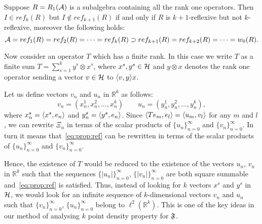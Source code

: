 \documentclass[12pt]{amsart}
\theoremstyle{case}
\begin{document}
  \begin{prop}
    Suppose $R = R_1(\cal{A})$ is a subalgebra containing all the rank one operators.
    Then $I \in ref_k(R)$ but $I \not\in ref_{k+1}(R)$ if and only if $R$ is $k + 1$-reflexive but not $k$-reflexive, moreover the
      following holds:
    \[
      \cal{A} = ref_1(R) = ref_2(R) = \dots = ref_k(R) \supset ref_{k + 1}(R) = ref_{k + 2}(R) = \dots = w_0(R).
    \]
  \end{prop}
  Now consider an operator $T$ which has a finite rank.
  In this case we write $T$ as a finite sum $T = \sum_{s=1}^k y^s \otimes x^s$,
    where $x^s, y^s \in \cal{H}$ and $y \otimes x$ denotes the rank one operator sending a vector $v \in \cal{H}$
    to $\inner{v}{y}x$.

  Let us define vectors $v_n$ and $u_n$ in $\mathbb{R}^k$ as follows:
  \begin{equation*}
    v_n = (x^1_n, x^2_n, \dots, x^k_n)\qquad
    u_n = (y^1_n, y^2_n, \dots, y^k_n),
  \end{equation*}
  where $x^s_n = \inner{x^s}{e_n}$ and $y^s_n = \inner{y^s}{e_n}$.
  Since $\inner{Te_m}{e_l} = \inner{u_m}{v_l}$ for any $m$ and $l$, we can rewrite $\Xi_n$ in terms of
    the scalar products of $\{u_n\}_{n=0}^\infty$ and $\{v_n\}_{n=0}^\infty$.
  In turn it means that~\eqref{eq:prop:ref} can be rewritten in terms of the scalar products
    of $\{u_n\}_{n=0}^\infty$ and $\{v_n\}_{n=0}^\infty$.

  Hence, the existence of $T$ would be reduced to the existence of
    the vectors $u_n$, $v_n$ in $\mathbb{R}^k$ such that the sequences $\{\lvert u_n\rvert\}_{n=0}^\infty$,
    $\{\lvert v_n\rvert\}_{n=0}^\infty$ are both square summable and~\eqref{eq:prop:ref} is satisfied.
  Thus, instead of looking for $k$ vectors $x^s$ and $y^s$ in $\cal{H}$, we would look for an infinite sequence
    of $k$-dimensional vectors $v_n$ and $u_n$ such that $\{v_n \}_{n=0}^\infty$, $\{u_n\}_{n=0}^\infty$ belong to $\ell^2(\mathbb{R}^k)$.
  This is one of the key ideas in our method of analysing $k$ point density property for $\fsys$.
\end{document}
